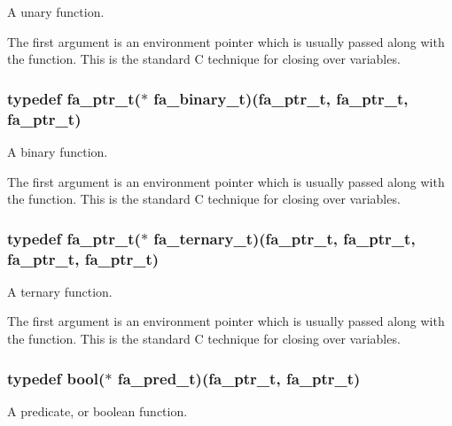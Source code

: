 A unary function. 

The first argument is an environment pointer which is usually passed along with the function. This is the standard C technique for closing over variables. \hypertarget{group___fa_gab70ba406935a18c1d645d12e7abf2e63}{
\subsubsection[{fa\-\_\-binary\-\_\-t}]{\setlength{\rightskip}{0pt plus 5cm}typedef {\bf fa\-\_\-ptr\-\_\-t}($\ast$  fa\-\_\-binary\-\_\-t)({\bf fa\-\_\-ptr\-\_\-t}, {\bf fa\-\_\-ptr\-\_\-t}, {\bf fa\-\_\-ptr\-\_\-t})}}\label{group___fa_gab70ba406935a18c1d645d12e7abf2e63}


A binary function. 

The first argument is an environment pointer which is usually passed along with the function. This is the standard C technique for closing over variables. \hypertarget{group___fa_gadbab7e8e405b3d2436de1e1126cc4817}{
\subsubsection[{fa\-\_\-ternary\-\_\-t}]{\setlength{\rightskip}{0pt plus 5cm}typedef {\bf fa\-\_\-ptr\-\_\-t}($\ast$  fa\-\_\-ternary\-\_\-t)({\bf fa\-\_\-ptr\-\_\-t}, {\bf fa\-\_\-ptr\-\_\-t}, {\bf fa\-\_\-ptr\-\_\-t}, {\bf fa\-\_\-ptr\-\_\-t})}}\label{group___fa_gadbab7e8e405b3d2436de1e1126cc4817}


A ternary function. 

The first argument is an environment pointer which is usually passed along with the function. This is the standard C technique for closing over variables. \hypertarget{group___fa_gae6b6ae9fb073db0ba0bd323d511c6a98}{
\subsubsection[{fa\-\_\-pred\-\_\-t}]{\setlength{\rightskip}{0pt plus 5cm}typedef bool($\ast$  fa\-\_\-pred\-\_\-t)({\bf fa\-\_\-ptr\-\_\-t}, {\bf fa\-\_\-ptr\-\_\-t})}}\label{group___fa_gae6b6ae9fb073db0ba0bd323d511c6a98}


A predicate, or boolean function. 

